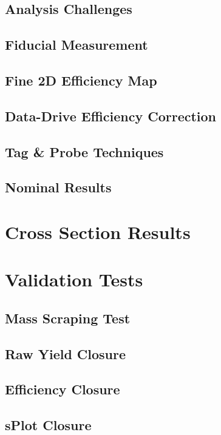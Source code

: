 \subsection{Analysis Challenges}

\subsection{Fiducial Measurement}

\subsection{Fine 2D Efficiency Map}

\subsection{Data-Drive Efficiency Correction}

\subsection{Tag \& Probe Techniques}

\subsection{Nominal Results}

\section{Cross Section Results} 

\section{Validation Tests} 

\subsection{Mass Scraping Test}

\subsection{Raw Yield Closure}

\subsection{Efficiency Closure}

\subsection{sPlot Closure}


